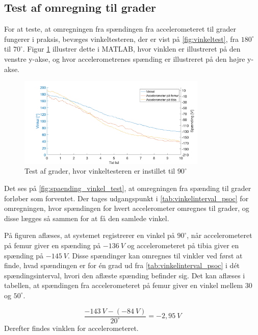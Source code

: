 \subsection{Test af omregning til grader}

For at teste, at omregningen fra spændingen fra accelerometeret til grader fungerer i praksis, bevæges vinkeltesteren, der er vist på \autoref{fig:vinkeltest}, fra $180^{\circ}$ til $70^{\circ}$. Figur \ref{fig:spaending_vinkel_test} illustrer dette i MATLAB, hvor vinklen er illustreret på den venstre y-akse, og hvor accelerometrenes spænding er illustreret på den højre y-akse. 

\begin{figure}[H]
\centering
\includegraphics[width=0.8\textwidth]{figures/spaending_vinkel_test}
\caption{Test af grader, hvor vinkeltesteren er instillet til $90^{\circ}$ }
\label{fig:spaending_vinkel_test}
\end{figure}

\noindent
Det ses på \autoref{fig:spaending_vinkel_test}, at omregningen fra spænding til grader forløber som forventet. Der tages udgangspunkt i \autoref{tab:vinkelinterval_psoc} for omregningen, hvor spændingen for hvert accelerometer omregnes til grader, og disse lægges så sammen for at få den samlede vinkel. 

På figuren aflæses, at systemet registrerer en vinkel på $90^{\circ}$, når  accelerometeret på femur giver en spænding på $-136~V$ og accelerometeret på tibia giver en spænding på $-145~V$. Disse spændinger kan omregnes til vinkler ved først at finde, hvad spændingen er for én grad ud fra \autoref{tab:vinkelinterval_psoc}  i dét spændingsinterval, hvori den aflæste spænding befinder sig. Det kan aflæses i tabellen, at spændingen fra accelerometeret på femur giver en vinkel mellem 30 og $50^{\circ}$.

\begin{equation}
\dfrac{-143~V-(-84~V)}{20^{\circ}}=-2,95~V
\end{equation}
Derefter findes vinklen for accelerometeret.

